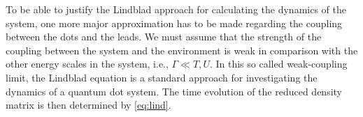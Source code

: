 \documentclass[../main.tex]{subfiles}
\begin{document}
To be able to justify the Lindblad approach for calculating the dynamics of the system, one more major approximation has to be made regarding the coupling between the dots and the leads. We must assume that the strength of the coupling between the system and the environment is weak in comparison with the other energy scales in the system, i.e., $\Gamma \ll T, U$. In this so called weak-coupling limit, the Lindblad equation is a standard approach for investigating the dynamics of a quantum dot system. The time evolution of the reduced density matrix is then determined by \cref{eq:lind}.

\end{document}
